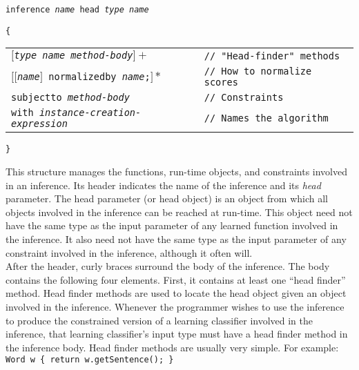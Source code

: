\vspace{-.25cm}
{\tt inference \emph{name} head \emph{type name}}

{\tt \{}

\begin{tabular}{ll}
\hspace{.2cm} {\tt $[$\emph{type name method-body}$]+$} &
{\tt // "Head-finder" methods} \\
\hspace{.2cm}
{\tt $[[$\emph{name}$]$ normalizedby \emph{name}\hspace{.1cm};$]*$} &
{\tt // How to normalize scores} \\
\hspace{.2cm} {\tt subjectto \emph{method-body}} &
{\tt // Constraints} \\
\hspace{.2cm} {\tt with \emph{instance-creation-expression}} &
{\tt // Names the algorithm}
\end{tabular}

{\tt \}} \\
\vspace{-.25cm}

\noindent
This structure manages the functions, run-time objects, and constraints
involved in an inference.  Its header indicates the name of the inference and
its \emph{head} parameter.  The head parameter (or head object) is an object
from which all objects involved in the inference can be reached at run-time.
This object need not have the same type as the input parameter of any learned
function involved in the inference.  It also need not have the same type as
the input parameter of any constraint involved in the inference, although it
often will. \\

After the header, curly braces surround the body of the inference.  The body
contains the following four elements.  First, it contains at least one ``head
finder'' method.  Head finder methods are used to locate the head object given
an object involved in the inference.  Whenever the programmer wishes to use
the inference to produce the constrained version of a learning classifier
involved in the inference, that learning classifier's input type must have a
head finder method in the inference body.  Head finder methods are usually
very simple.  For example: \\

\vspace{-.25cm}
{\tt Word w \{ return w.getSentence(); \}} \\
\vspace{-.25cm}

